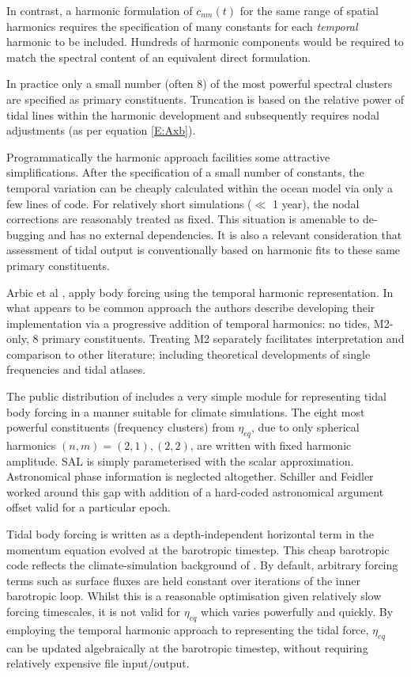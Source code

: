 In contrast, a harmonic formulation of $c_{nm}(t)$ for the same range of spatial harmonics requires the specification of many constants for each \emph{temporal} harmonic to be included.  
Hundreds of harmonic components \citep[pp3]{Desai:2006wo} would be required to match the spectral content of an equivalent direct formulation.


In practice only a small number (often 8) of the most powerful spectral clusters are specified as primary constituents.  
Truncation is based on the relative power of tidal lines within the harmonic development and subsequently requires nodal adjustments (as per equation \ref{E:Axb}).

Programmatically the harmonic approach facilities some attractive simplifications.  
After the specification of a small number of constants, the temporal variation can be cheaply calculated within the ocean model via only a few lines of code.   
For relatively short simulations ($\ll$ 1 year), the nodal corrections are reasonably treated as fixed.   This situation is amenable to de-bugging and has no external dependencies.
It is also a relevant consideration that assessment of tidal output is conventionally based on harmonic fits to these same primary constituents.

Arbic et al \citep{Arbic:2010us}, apply body forcing using the temporal harmonic representation. In what appears to be common approach the authors describe developing their implementation via a progressive addition of temporal harmonics: no tides, M2-only, 8 primary constituents.  Treating M2 separately facilitates interpretation and comparison to other literature; including theoretical developments of single frequencies and tidal atlases.


The public distribution of \MOM{} includes a very simple module for representing tidal body forcing in a manner suitable for climate simulations\cite[pp263] {Griffies:2008vh}.
The eight most powerful constituents (frequency clusters) from $\eta_{eq}$, due to only spherical harmonics $(n,m) = (2,1) , (2,2)$, are written with fixed harmonic amplitude.  SAL is simply parameterised with the scalar approximation. 
Astronomical phase information is neglected altogether.
Schiller and Feidler \citep{Schiller:2007gk} worked around this gap with addition of a hard-coded astronomical argument offset valid for a particular epoch.

Tidal body forcing is written as a depth-independent horizontal term in the momentum equation evolved at the barotropic timestep.
This cheap barotropic code reflects the climate-simulation background of \MOM{}.  
By default, arbitrary forcing terms such as surface fluxes are held constant over iterations of the inner barotropic loop.  
Whilst this is a reasonable optimisation given relatively slow forcing timescales, it is not valid for $\eta_{eq}$ which varies powerfully and quickly.
By employing the temporal harmonic approach to representing the tidal force, $\eta_{eq}$ can be updated algebraically at the barotropic timestep, without requiring relatively expensive file input/output.



